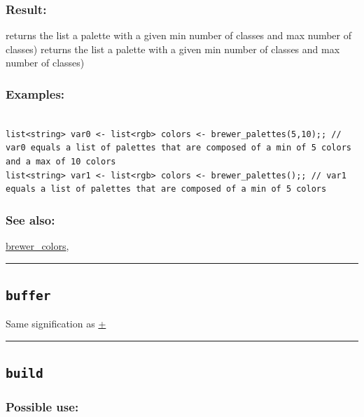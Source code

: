 \documentclass[]{book}
\theoremstyle{definition}
\theoremstyle{definition}
\theoremstyle{definition}
\theoremstyle{remark}
\begin{document}
\subsubsection{Result:}\label{result-77}

returns the list a palette with a given min number of classes and max
number of classes) returns the list a palette with a given min number of
classes and max number of classes)

\subsubsection{Examples:}\label{examples-60}

\begin{verbatim}
 
list<string> var0 <- list<rgb> colors <- brewer_palettes(5,10);; // var0 equals a list of palettes that are composed of a min of 5 colors and a max of 10 colors 
list<string> var1 <- list<rgb> colors <- brewer_palettes();; // var1 equals a list of palettes that are composed of a min of 5 colors
\end{verbatim}

\subsubsection{See also:}\label{see-also-49}

\href{operators-b-to-c.html\#brewer_colors}{brewer\_colors},

\begin{center}\rule{0.5\linewidth}{\linethickness}\end{center}

\subsection{\texorpdfstring{\texttt{buffer}}{buffer}}\label{buffer}

Same signification as \href{operators-a-to-a.html\#+}{+}

\begin{center}\rule{0.5\linewidth}{\linethickness}\end{center}

\subsection{\texorpdfstring{\texttt{build}}{build}}\label{build}

\subsubsection{Possible use:}\label{possible-use-79}
\end{document}

